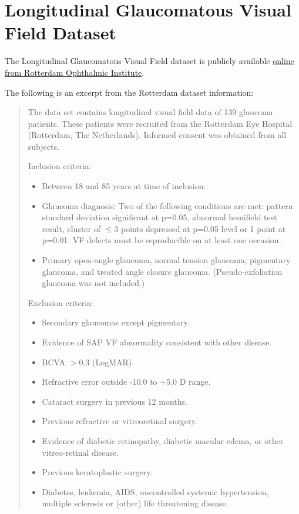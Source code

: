 \chapter{Longitudinal Glaucomatous Visual Field Dataset} \label{chapter:rotterdam}

The Longitudinal Glaucomatous Visual Field dataset is publicly available \href{http://www.rodrep.com/}{online from Rotterdam Ophthalmic Institute}. \cite{Bryan2013}

The following is an excerpt from the Rotterdam dataset information:

\begin{quotation}
The data set contains longitudinal visual field data of 139 glaucoma patients. These patients were recruited from the Rotterdam Eye Hospital (Rotterdam, The Netherlands). Informed consent was obtained from all subjects.

Inclusion criteria:

\begin{itemize}
\item Between 18 and 85 years at time of inclusion.
\item Glaucoma diagnosis: Two of the following conditions are met: pattern standard deviation significant at p=0.05, abnormal hemifield test result, cluster of $\leq3$ points depressed at p=0.05 level or 1 point at p=0.01. VF defects must be reproducible on at least one occasion.
\item Primary open-angle glaucoma, normal tension glaucoma, pigmentary glaucoma, and treated angle closure glaucoma. (Pseudo-exfoliation glaucoma was not included.)
\end{itemize}


Exclusion criteria:

\begin{itemize}
\item Secondary glaucomas except pigmentary.
\item Evidence of SAP VF abnormality consistent with other disease.
\item BCVA $> 0.3$ (LogMAR).
\item Refractive error outside -10.0 to +5.0 D range.
\item Cataract surgery in previous 12 months.
\item Previous refractive or vitreoretinal surgery.
\item Evidence of diabetic retinopathy, diabetic macular edema, or other vitreo-retinal disease.
\item Previous keratoplastic surgery.
\item Diabetes, leukemia, AIDS, uncontrolled systemic hypertension, multiple sclerosis or (other) life threatening disease.
\end{itemize}



\end{quotation}
